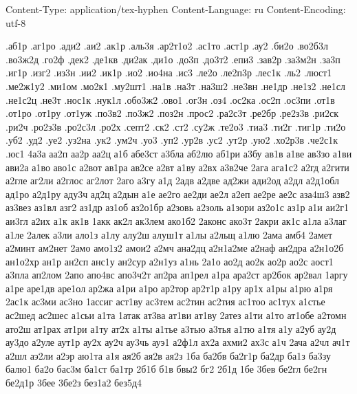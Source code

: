 Content-Type: application/tex-hyphen
Content-Language: ru
Content-Encoding: utf-8

%
%

.аб1р
.аг1ро
.ади2
.аи2
.ак1р
.аль3я
.ар2т1о2
.ас1то
.аст1р
.ау2
.би2о
.во2б3л
.во3ж2д
.го2ф
.дек2
.де1кв
.ди2ак
.ди1о
.до3п
.до3т2
.епи3
.зав2р
.за3м2н
.за3п
.иг1р
.изг2
.из3н
.ии2
.ик1р
.ио2
.ио4на
.ис3
.ле2о
.ле2п3р
.лес1к
.ль2
.люст1
.ме2ж1у2
.ми1ом
.мо2к1
.му2шт1
.на1в
.на3т
.на3ш2
.не3вн
.не1др
.не1з2
.не1сл
.не1с2ц
.не3т
.нос1к
.нук1л
.обо3ж2
.ово1
.ог3н
.оз4
.ос2ка
.ос2п
.ос3пи
.от1в
.от1ро
.от1ру
.от1уж
.по3в2
.по3ж2
.поз2н
.прос2
.ра2с3т
.ре2бр
.ре2з3в
.ри2ск
.ри2ч
.ро2з3в
.ро2с3л
.ро2х
.септ2
.ск2
.ст2
.су2ж
.те2о3
.тиа3
.ти2г
.тиг1р
.ти2о
.уб2
.уд2
.уе2
.уз2на
.ук2
.ум2ч
.уо3
.уп2
.ур2в
.ус2
.ут2р
.ую2
.хо2р3в
.че2с1к
.юс1
4а3а
аа2п
аа2р
аа2ц
а1б
абе3ст
а3бла
аб2лю
аб1ри
а3бу
ав1в
а1ве
ав3зо
а1ви
ави2а
а1во
аво1с
а2вот
ав1ра
ав2се
а2вт
а1ву
а2вх
а3в2че
2ага
ага1с2
а2гд
а2гити
а2гле
аг2ли
а2глос
аг2лот
2аго
а3гу
а1д
2адв
а2две
ад2жи
ади2од
а2дл
а2д1обл
ад1ро
а2д1ру
аду3ч
ад2ц
а2дын
а1е
ае2го
ае2ди
ае2л
а2еп
ае2ре
ае2с
аза4ш3
азв2
аз3вез
аз1вл
азг2
аз1др
аз1об
аз2о1бр
а2зовь
а2золь
а1зори
аз2о1с
аз1р
а1и
аи2г1
аи3гл
а2их
а1к
ак1в
1акк
ак2л
ак3лем
ако1б2
2аконс
ако3т
2акри
ак1с
а1ла
а3лаг
а1ле
2алек
а3ли
ало1з
а1лу
алу2ш
алуш1т
а1лы
а2льщ
а1лю
2ама
амб4
2амет
а2минт
ам2нет
2амо
амо1з2
амои2
а2мч
ана2дц
а2н1а2ме
а2наф
ан2дра
а2н1о2б
ан1о2хр
ан1р
ан2сп
анс1у
ан2сур
а2н1уз
а1нь
2а1о
ао2д
ао2к
ао2р
ао2с
аост1
а3пла
ап2лом
2апо
апо4вс
апо3ч2т
ап2ра
ап1рел
а1ра
ара2ст
ар2бок
ар2вал
1аргу
а1ре
аре1дв
аре1ол
ар2жа
а1ри
а1ро
ар2тор
ар2т1р
а1ру
ар1х
а1ры
а1рю
а1ря
2ас1к
ас3ми
ас3но
1ассиг
аст1ву
ас3тем
ас2тин
ас2тия
ас1тоо
ас1тух
а1стье
ас2шед
ас2шес
а1сьи
а1та
1атак
ат3ва
ат1ви
ат1ву
2атез
а1ти
а1то
ат1обе
а2томн
ато2ш
ат1рах
ат1ри
а1ту
ат2х
а1ты
а1тье
а3тью
а3тья
а1тю
а1тя
а1у
а2уб
ау2д
ау3до
а2уле
аут1р
ау2х
ау2ч
ау3чь
ауэ1
а2ф1л
ах2а
ахми2
ах3с
а1ч
2ача
а2чл
ач1т
а2шл
аэ2ли
а2эр
аю1та
а1я
ая2б
ая2в
ая2з
1ба
ба2бв
ба2г1р
ба2др
ба1з
ба3зу
балю1
ба2о
бас3м
ба1ст
ба1тр
2б1б
б1в
бвы2
бг2
2б1д
1бе
3бев
бе2гл
бе2гн
бе2д1р
3бее
3бе2з
без1а2
без5д4
